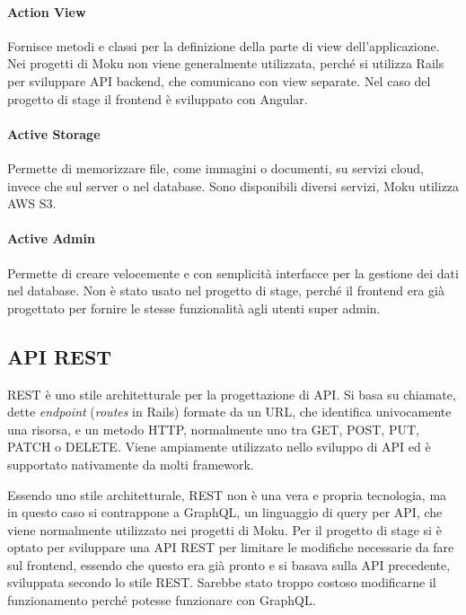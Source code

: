 \paragraph{Action View} Fornisce metodi e classi per la definizione della parte di view dell'applicazione. Nei progetti di Moku non viene generalmente utilizzata, perché si utilizza Rails per sviluppare API backend, che comunicano con view separate. Nel caso del progetto di stage il frontend è sviluppato con Angular.
\paragraph{Active Storage} Permette di memorizzare file, come immagini o documenti, su servizi cloud, invece che sul server o nel database. Sono disponibili diversi servizi, Moku utilizza AWS S3.
\paragraph{Active Admin} Permette di creare velocemente e con semplicità interfacce per la gestione dei dati nel database. Non è stato usato nel progetto di stage, perché il frontend era già progettato per fornire le stesse funzionalità agli utenti super admin.

\subsection{API REST}
REST è uno stile architetturale per la progettazione di API. Si basa su chiamate, dette \emph{endpoint} (\emph{routes} in Rails) formate da un URL, che identifica univocamente una risorsa, e un metodo HTTP, normalmente uno tra GET, POST, PUT, PATCH o DELETE. Viene ampiamente utilizzato nello sviluppo di API ed è supportato nativamente da molti framework.

Essendo uno stile architetturale, REST non è una vera e propria tecnologia, ma in questo caso si contrappone a GraphQL, un linguaggio di query per API, che viene normalmente utilizzato nei progetti di Moku. Per il progetto di stage si è optato per sviluppare una API REST per limitare le modifiche necessarie da fare sul frontend, essendo che questo era già pronto e si basava sulla API precedente, sviluppata secondo lo stile REST. Sarebbe stato troppo costoso modificarne il funzionamento perché potesse funzionare con GraphQL.
